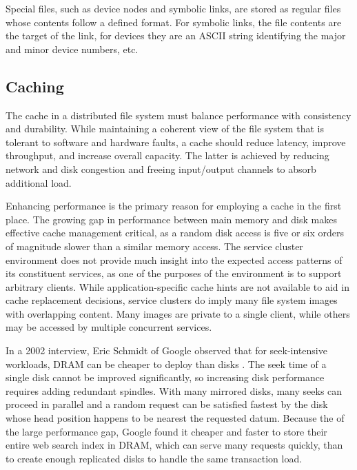 Special files, such as device nodes and symbolic links, are stored as regular files whose contents follow a defined format. For symbolic links, the file contents are the target of the link, for devices they are an ASCII string identifying the major and minor device numbers, etc.

\subsection{Caching}

The cache in a distributed file system must balance performance with consistency and durability. While maintaining a coherent view of the file system that is tolerant to software and hardware faults, a cache should reduce latency, improve throughput, and increase overall capacity. The latter is achieved by reducing network and disk congestion and freeing input/output channels to absorb additional load.

Enhancing performance is the primary reason for employing a cache in the first place. The growing gap in performance between main memory and disk makes effective cache management critical, as a random disk access is five or six orders of magnitude slower than a similar memory access. The service cluster environment does not provide much insight into the expected access patterns of its constituent services, as one of the purposes of the environment is to support arbitrary clients. While application-specific cache hints are not available to aid in cache replacement decisions, service clusters do imply many file system images with overlapping content. Many images are private to a single client, while others may be accessed by multiple concurrent services.

In a 2002 interview, Eric Schmidt of Google observed that for seek-intensive workloads, DRAM can be cheaper to deploy than disks \cite{spring}. The seek time of a single disk cannot be improved significantly, so increasing disk performance requires adding redundant spindles. With many mirrored disks, many seeks can proceed in parallel and a random request can be satisfied fastest by the disk whose head position happens to be nearest the requested datum. Because the of the large performance gap, Google found it cheaper and faster to store their entire web search index in DRAM, which can serve many requests quickly, than to create enough replicated disks to handle the same transaction load.

